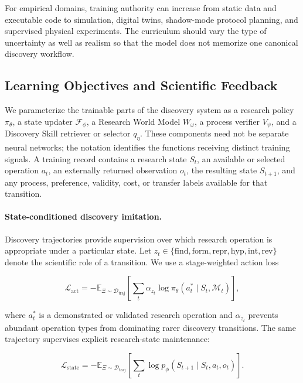 \documentclass[11pt, a4paper, copyright]{google}
\begin{document}
For empirical domains, training authority can increase from static data and executable code to simulation, digital twins, shadow-mode protocol planning, and supervised physical experiments. The curriculum should vary the type of uncertainty as well as realism so that the model does not memorize one canonical discovery workflow.

\subsection{Learning Objectives and Scientific Feedback}
\label{subsec:process-supervision}

We parameterize the trainable parts of the discovery system as a research policy $\pi_{\theta}$, a state updater $\mathcal{F}_{\phi}$, a Research World Model $W_{\omega}$, a process verifier $V_{\psi}$, and a Discovery Skill retriever or selector $q_{\eta}$. These components need not be separate neural networks; the notation identifies the functions receiving distinct training signals. A training record contains a research state $S_t$, an available or selected operation $a_t$, an externally returned observation $o_t$, the resulting state $S_{t+1}$, and any process, preference, validity, cost, or transfer labels available for that transition.

\paragraph{State-conditioned discovery imitation.}
Discovery trajectories provide supervision over which research operation is appropriate under a particular state. Let $z_t\in\{\mathrm{find},\mathrm{form},\mathrm{repr},\mathrm{hyp},\mathrm{int},\mathrm{rev}\}$ denote the scientific role of a transition. We use a stage-weighted action loss

\begin{equation}
\mathcal{L}_{\mathrm{act}}
=
-\mathbb{E}_{\Xi\sim\mathcal{D}_{\mathrm{traj}}}
\left[
\sum_t \alpha_{z_t}
\log \pi_{\theta}(a_t^{*}\mid S_t,\mathcal{M}_t)
\right],
\label{eq:discovery-action-loss}
\end{equation}

where $a_t^{*}$ is a demonstrated or validated research operation and $\alpha_{z_t}$ prevents abundant operation types from dominating rarer discovery transitions. The same trajectory supervises explicit research-state maintenance:

\begin{equation}
\mathcal{L}_{\mathrm{state}}
=
-\mathbb{E}_{\Xi\sim\mathcal{D}_{\mathrm{traj}}}
\left[
\sum_t
\log p_{\phi}
\left(
S_{t+1}\mid S_t,a_t,o_t
\right)
\right].
\label{eq:research-state-loss}
\end{equation}
\end{document}
